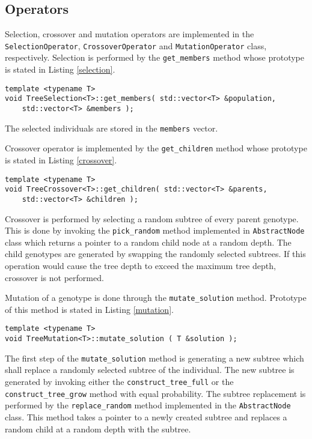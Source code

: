 \subsection{Operators}
Selection, crossover and mutation operators are implemented in the \\\texttt{SelectionOperator}, \texttt{CrossoverOperator} and \texttt{MutationOperator} class, respectively.
Selection is performed by the \texttt{get\_members} method whose prototype is stated in Listing \ref{selection}.
\begin{lstlisting}[frame=none, label={selection}, caption={Prototype of the \texttt{get\_members} method which performs selection.}, captionpos=b]
template <typename T>
void TreeSelection<T>::get_members( std::vector<T> &population, 
	std::vector<T> &members );
\end{lstlisting}
The selected individuals are stored in the \texttt{members} vector.

Crossover operator is implemented by the \texttt{get\_children} method whose prototype is stated in Listing \ref{crossover}.
\begin{lstlisting}[frame=none, label={crossover}, caption={Prototype of the \texttt{get\_children} method which performs crossover.}, captionpos=b]
template <typename T>
void TreeCrossover<T>::get_children( std::vector<T> &parents, 
	std::vector<T> &children );
\end{lstlisting}
Crossover is performed by selecting a random subtree of every parent genotype.
This is done by invoking the \texttt{pick\_random} method implemented in \texttt{AbstractNode} class which returns a pointer to a random child node at a random depth.
The child genotypes are generated by swapping the randomly selected subtrees.
If this operation would cause the tree depth to exceed the maximum tree depth, crossover is not performed.

Mutation of a genotype is done through the \texttt{mutate\_solution} method.
Prototype of this method is stated in Listing \ref{mutation}.
\begin{lstlisting}[frame=none, label={mutation}, caption={Prototype of the \texttt{mutate\_solution} method.}, captionpos=b]
template <typename T>
void TreeMutation<T>::mutate_solution ( T &solution );
\end{lstlisting}
The first step of the \texttt{mutate\_solution} method is generating a new subtree which shall replace a randomly selected subtree of the individual.
The new subtree is generated by invoking either the \texttt{construct\_tree\_full} or the \texttt{construct\_tree\_grow} method with equal probability.
The subtree replacement is performed by the \texttt{replace\_random} method implemented in the \texttt{AbstractNode} class.
This method takes a pointer to a newly created subtree and replaces a random child at a random depth with the subtree.


